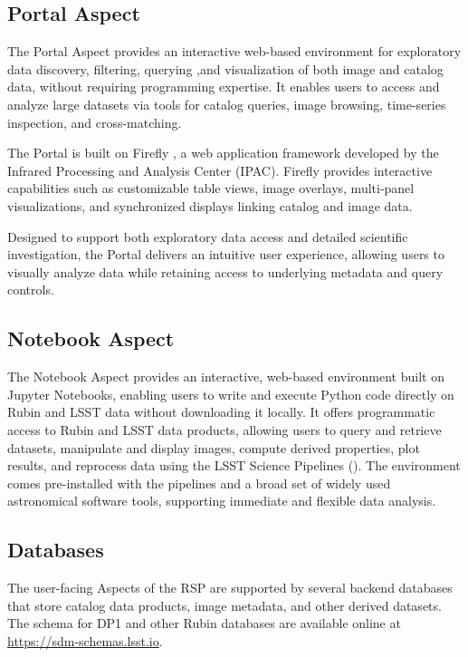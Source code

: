 \subsection{Portal Aspect}
\label{ssec:rsp_portal}
The Portal Aspect provides an interactive web-based environment for exploratory data discovery, filtering, querying ,and visualization of both image and catalog data, without requiring programming expertise.
It enables users to access and analyze large datasets via tools for catalog queries, image browsing, time-series inspection, and cross-matching.

The Portal is built on \gls{Firefly} \citep{2019ASPC..521...32W}, a  web application framework developed by the Infrared Processing and Analysis Center (IPAC).
\gls{Firefly} provides interactive capabilities such as customizable table views, image overlays, multi-panel visualizations, and synchronized displays linking catalog and image data.

Designed to support both exploratory data access and detailed scientific investigation, the Portal delivers an intuitive user experience, allowing users to visually analyze data while retaining access to underlying metadata and query controls.

\subsection{Notebook Aspect}
\label{subsec:notebook}
The Notebook Aspect provides an interactive, web-based environment built on Jupyter Notebooks, enabling users to write and execute Python code directly on Rubin and \gls{LSST} data without downloading it locally.
It offers programmatic access to Rubin and LSST data products, allowing users to query and retrieve datasets, manipulate and display images, compute derived properties, plot results, and reprocess data using the LSST Science Pipelines ().
The environment comes pre-installed with the pipelines and a broad set of widely used astronomical \gls{software} tools, supporting immediate and flexible data analysis.

\subsection{Databases}
\label{ssec:databases}
The user-facing Aspects of the \gls{RSP} are supported by several backend databases that store catalog data products, image metadata, and other derived datasets.
The \gls{schema} for DP1 and other Rubin databases are available online at \url{https://sdm-schemas.lsst.io}.

